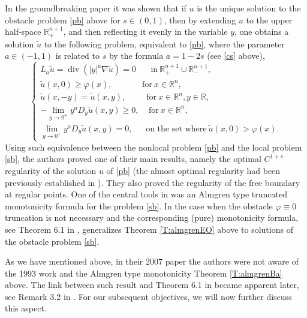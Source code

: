 \documentclass[11pt]{amsart}
\theoremstyle{plain}
\numberwithin{equation}{section}
\begin{document}
In the groundbreaking paper \cite{CSS} it was shown that if $u$ is the unique solution to the obstacle problem \eqref{pb} above for $s\in (0,1)$, then by extending $u$ to the upper half-space  ${\mathbb R}^{n+1}_+$, and then reflecting it evenly in the variable $y$, one obtains a solution $\tilde u$ to the following problem, equivalent to \eqref{pb}, where the parameter $a\in (-1,1)$ is related to $s$ by the formula $a = 1-2s$ (see \eqref{cs} above),
\begin{equation}\label{sb}
\begin{cases}
L_a \tilde u = \operatorname{div}(|y|^a \nabla \tilde u) = 0\ \ \ \ \ \ \ \ \text{in}\ {\mathbb R}^{n+1}_+\cup {\mathbb R}^{n+1}_-,
\\
\tilde u(x,0) \ge {\varphi}(x),\ \ \ \ \ \ \ \ \ \ \ \ \ \ \ \ \text{for}\ x\in {\mathbb R^n},
\\
\tilde u(x,-y) = \tilde u(x,y),\ \ \ \ \ \ \ \ \ \  \ \text{for}\ x\in {\mathbb R^n}, y\in {\mathbb R},
\\
- \underset{y\to 0^+}{\lim} y^a D_y\tilde u(x,y) \ge 0, \ \ \ \ \  \text{for}\ x\in {\mathbb R^n},
\\
\underset{y\to 0^+}{\lim} y^a D_y \tilde u(x,y) = 0, \ \ \ \ \ \ \ \text{on the set where}\ \tilde u(x,0) > {\varphi}(x).
\end{cases}
\end{equation}
Using such equivalence between the nonlocal problem \eqref{pb} and the local problem \eqref{sb}, the authors proved one of their main results, namely the optimal $C^{1+s}$ regularity of the solution $u$ of \eqref{pb} (the almost optimal regularity had been previously established in \cite{S}). They also proved the regularity of the free boundary at regular points. One of the central tools in \cite{CSS} was an Almgren type truncated monotonicity formula for the problem \eqref{sb}. In the case when the obstacle ${\varphi} \equiv 0$ truncation is not necessary and the  corresponding (pure) monotonicity formula, see Theorem 6.1 in \cite{CS}, generalizes Theorem \ref{T:almgrenEO} above to solutions of the obstacle problem \eqref{sb}.

As we have mentioned above,  in their 2007 paper \cite{CS} the authors were not aware of the 1993 work \cite{G} and the Almgren type monotonicity Theorem \ref{T:almgrenBa} above. The link between such result and Theorem 6.1 in \cite{CS} became apparent later, see Remark 3.2 in \cite{CSS}. For our subsequent objectives, we will now further discuss this aspect.
\end{document}
